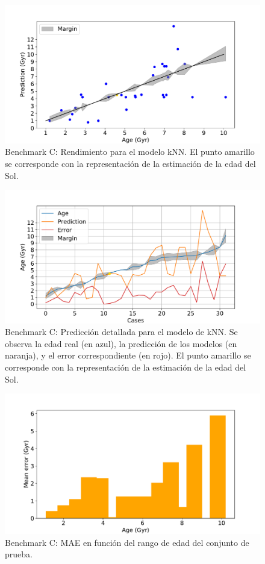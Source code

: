 \begin{figure}[H]
\begin{center}
 \includegraphics[width=0.8\linewidth]{Figuras/Experimentos/B_C_knn_1.pdf}
\end{center}
\caption{Benchmark C: Rendimiento para el modelo kNN. El punto amarillo se corresponde con la representación de la estimación de la edad del Sol.}
 \label{fig:benchC_details_knn_1}
\end{figure}

\begin{figure}[H]
\begin{center}
 \includegraphics[width=0.8\linewidth]{Figuras/Experimentos/B_C_knn_2.pdf}
\end{center}
\caption{Benchmark C: Predicción detallada para el modelo de kNN. Se observa la edad real (en azul), la predicción de los modelos (en naranja), y el error correspondiente (en rojo). El punto amarillo se corresponde con la representación de la estimación de la edad del Sol.}
 \label{fig:benchC_details_knn_2}
\end{figure}

\begin{figure}[H]
\begin{center}
 \includegraphics[width=0.8\linewidth]{Figuras/Experimentos/B_C_knn_3.pdf}
\end{center}
\caption{Benchmark C: MAE en función del rango de edad del conjunto de prueba.}
 \label{fig:benchC_details_knn_3}
\end{figure}

